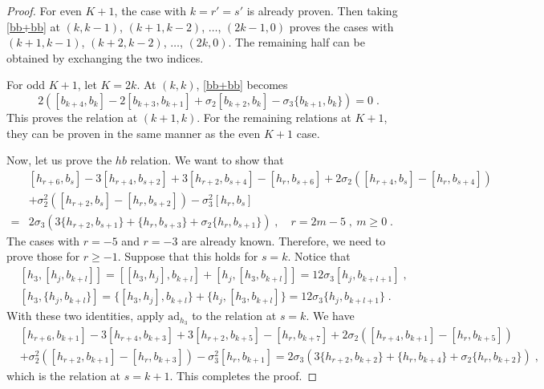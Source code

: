 \documentclass[11pt]{article}
\numberwithin{equation}{section}
\numberwithin{figure}{section}
\numberwithin{table}{section}
\begin{document}
\begin{proof}
	For even $K+1$, the case with $k=r'=s'$ is already proven. Then taking \eqref{bb+bb} at $(k,k-1)$, $(k+1,k-2)$, $\dots$, $(2k-1,0)$ proves the cases with $(k+1,k-1)$, $(k+2,k-2)$, $\dots$, $(2k,0)$. The remaining half can be obtained by exchanging the two indices.

	For odd $K+1$, let $K=2k$. At $(k,k)$, \eqref{bb+bb} becomes
	\begin{equation}
		2\left([b_{k+4},b_k]-2[b_{k+3},b_{k+1}]+\sigma_2[b_{k+2},b_k]-\sigma_3\{b_{k+1},b_k\}\right)=0\;.
	\end{equation}
	This proves the relation at $(k+1,k)$. For the remaining relations at $K+1$, they can be proven in the same manner as the even $K+1$ case.

	Now, let us prove the $hb$ relation. We want to show that
	\begin{align}
		&[h_{r+6},b_s]-3[h_{r+4},b_{s+2}]+3[h_{r+2},b_{s+4}]-[h_r,b_{s+6}]+2\sigma_2([h_{r+4},b_s]-[h_r,b_{s+4}])\nonumber\\
		&+\sigma_2^2([h_{r+2},b_s]-[h_r,b_{s+2}])-\sigma_3^2[h_r,b_s]\nonumber\\
		=&2\sigma_3(3\{h_{r+2},b_{s+1}\}+\{h_r,b_{s+3}\}+\sigma_2\{h_r,b_{s+1}\})\;,\quad r=2m-5\;,~m\geq0\;.
	\end{align}
	The cases with $r=-5$ and $r=-3$ are already known. Therefore, we need to prove those for $r\geq-1$. Suppose that this holds for $s=k$. Notice that
	\begin{subequations}
		\begin{align}
			&[h_3,[h_j,b_{k+l}]]=[[h_3,h_j],b_{k+l}]+[h_j,[h_3,b_{k+l}]]=12\sigma_3[h_j,b_{k+l+1}]\;,\\
			&[h_3,\{h_j,b_{k+l}\}]=\{[h_3,h_j],b_{k+l}\}+\{h_j,[h_3,b_{k+l}]\}=12\sigma_3\{h_j,b_{k+l+1}\}\;.
		\end{align}
	\end{subequations}
	With these two identities, apply $\mathrm{ad}_{h_3}$ to the relation at $s=k$. We have
	\begin{align}
		&[h_{r+6},b_{k+1}]-3[h_{r+4},b_{k+3}]+3[h_{r+2},b_{k+5}]-[h_r,b_{k+7}]+2\sigma_2\left([h_{r+4},b_{k+1}]-[h_r,b_{k+5}]\right)\nonumber\\
		&+\sigma_2^2\left([h_{r+2},b_{k+1}]-[h_r,b_{k+3}]\right)-\sigma_3^2[h_r,b_{k+1}]=2\sigma_3\left(3\{h_{r+2},b_{k+2}\}+\{h_r,b_{k+4}\}+\sigma_2\{h_r,b_{k+2}\}\right)\;,
	\end{align}
	which is the relation at $s=k+1$. This completes the proof.
\end{proof}
\end{document}
